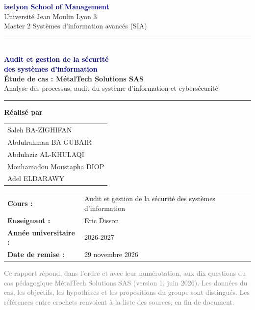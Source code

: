 \documentclass[11pt,a4paper]{article}
\begin{document}
\begin{titlepage}
\hypersetup{pageanchor=false}
\thispagestyle{empty}
\vspace*{6mm}
{\large\textcolor{navy}{\textbf{iaelyon School of Management}}}\\[3pt]
{\normalsize Université Jean Moulin Lyon 3}\\[3pt]
{\normalsize Master 2 Systèmes d'information avancés (SIA)}\par
\vspace{24mm}
\textcolor{teal}{\rule{\linewidth}{2pt}}\\[8mm]
{\huge\bfseries\textcolor{navy}{Audit et gestion de la sécurité\\[2mm]des systèmes d'information}}\\[9mm]
{\LARGE\bfseries Étude de cas : MétalTech Solutions SAS}\\[5mm]
{\large Analyse des processus, audit du système d'information et cybersécurité}\\[7mm]
\textcolor{teal}{\rule{\linewidth}{0.8pt}}
\vspace{16mm}

{\large\textbf{Réalisé par}}\\[4mm]
\begin{tabular}{@{}l@{}}
Saleh BA-ZIGHIFAN\\[2mm]
Abdulrahman BA GUBAIR\\[2mm]
Abdulaziz AL-KHULAQI\\[2mm]
Mouhamadou Moustapha DIOP\\[2mm]
Adel ELDARAWY
\end{tabular}
\vfill
\begin{tabular}{@{}ll@{}}
\textbf{Cours :} & Audit et gestion de la sécurité des systèmes d'information\\[2mm]
\textbf{Enseignant :} & Eric Disson\\[2mm]
\textbf{Année universitaire :} & 2026-2027\\[2mm]
\textbf{Date de remise :} & 29 novembre 2026
\end{tabular}
\end{titlepage}
\hypersetup{pageanchor=true}
\setcounter{page}{2}

\tableofcontents
\vfill
{\small\textcolor{graytext}{Ce rapport répond, dans l'ordre et avec leur numérotation, aux dix questions du cas pédagogique \og MétalTech Solutions SAS \fg{} (version 1, juin 2026). Les données du cas, les objectifs, les hypothèses et les propositions du groupe sont distingués. Les références entre crochets renvoient à la liste des sources, en fin de document.}}
\clearpage
\end{document}
